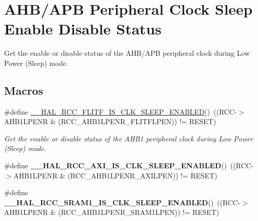 \hypertarget{group___r_c_c___clock___sleep___enable___disable___status}{}\section{A\+H\+B/\+A\+PB Peripheral Clock Sleep Enable Disable Status}
\label{group___r_c_c___clock___sleep___enable___disable___status}


Get the enable or disable status of the A\+H\+B/\+A\+PB peripheral clock during Low Power (Sleep) mode.  


\subsection*{Macros}
\begin{DoxyCompactItemize}
\item 
\#define \mbox{\hyperlink{group___r_c_c___clock___sleep___enable___disable___status_ga968fb378568454a2913e11a238131ae4}{\+\_\+\+\_\+\+H\+A\+L\+\_\+\+R\+C\+C\+\_\+\+F\+L\+I\+T\+F\+\_\+\+I\+S\+\_\+\+C\+L\+K\+\_\+\+S\+L\+E\+E\+P\+\_\+\+E\+N\+A\+B\+L\+ED}}()~((R\+CC-\/$>$A\+H\+B1\+L\+P\+E\+NR \& (R\+C\+C\+\_\+\+A\+H\+B1\+L\+P\+E\+N\+R\+\_\+\+F\+L\+I\+T\+F\+L\+P\+EN)) != R\+E\+S\+ET)
\begin{DoxyCompactList}\small\item\em Get the enable or disable status of the A\+H\+B1 peripheral clock during Low Power (Sleep) mode. \end{DoxyCompactList}\item 
\mbox{\label{group___r_c_c___clock___sleep___enable___disable___status_gaefc08586153c9d0366dfdf1e93f2c5b7}} 
\#define {\bfseries \+\_\+\+\_\+\+H\+A\+L\+\_\+\+R\+C\+C\+\_\+\+A\+X\+I\+\_\+\+I\+S\+\_\+\+C\+L\+K\+\_\+\+S\+L\+E\+E\+P\+\_\+\+E\+N\+A\+B\+L\+ED}()~((R\+CC-\/$>$A\+H\+B1\+L\+P\+E\+NR \& (R\+C\+C\+\_\+\+A\+H\+B1\+L\+P\+E\+N\+R\+\_\+\+A\+X\+I\+L\+P\+EN)) != R\+E\+S\+ET)
\item 
\mbox{\label{group___r_c_c___clock___sleep___enable___disable___status_ga2efc49cf2ff318aa9ce6300b77b01a6c}} 
\#define {\bfseries \+\_\+\+\_\+\+H\+A\+L\+\_\+\+R\+C\+C\+\_\+\+S\+R\+A\+M1\+\_\+\+I\+S\+\_\+\+C\+L\+K\+\_\+\+S\+L\+E\+E\+P\+\_\+\+E\+N\+A\+B\+L\+ED}()~((R\+CC-\/$>$A\+H\+B1\+L\+P\+E\+NR \& (R\+C\+C\+\_\+\+A\+H\+B1\+L\+P\+E\+N\+R\+\_\+\+S\+R\+A\+M1\+L\+P\+EN)) != R\+E\+S\+ET)

\end{DoxyCompactItemize}
